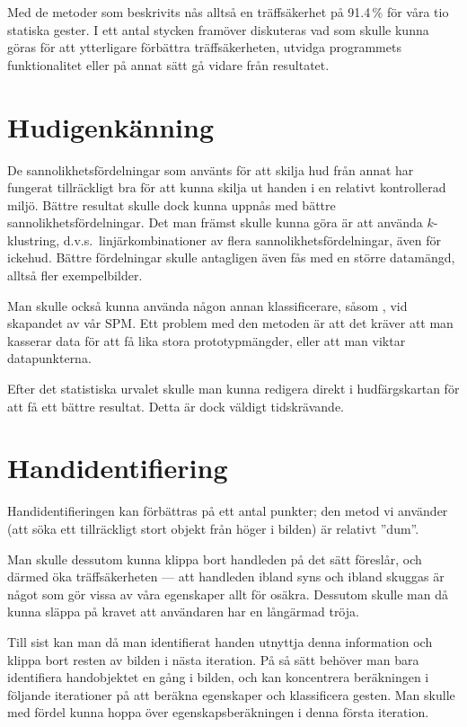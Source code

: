 \documentclass[../rapport_MVEX01-11-05]{subfiles}
\begin{document}
Med de metoder som beskrivits nås alltså en träffsäkerhet på 91.4\,\%
för våra tio statiska gester. I ett antal stycken framöver diskuteras
vad som skulle kunna göras för att ytterligare förbättra
träffsäkerheten, utvidga programmets funktionalitet eller på annat
sätt gå vidare från resultatet.

\section{Hudigenkänning}
De sannolikhetsfördelningar som använts för att skilja hud från annat
har fungerat tillräckligt bra för att kunna skilja ut handen i en
relativt kontrollerad miljö. Bättre resultat skulle dock kunna uppnås
med bättre sannolikhetsfördelningar. Det man främst skulle kunna göra
är att använda $k$-klustring, d.v.s.~linjärkombinationer av flera
sannolikhetsfördelningar, även för ickehud. Bättre fördelningar skulle
antagligen även fås med en större datamängd, alltså fler
exempelbilder.

Man skulle också kunna använda någon annan klassificerare, såsom \knn,
vid skapandet av vår SPM. Ett problem med den metoden är att det
kräver att man kasserar data för att få lika stora prototypmängder,
eller att man viktar datapunkterna.

Efter det statistiska urvalet skulle man kunna redigera direkt i
hudfärgskartan för att få ett bättre resultat. Detta är dock väldigt
tidskrävande.

\section{Handidentifiering}
Handidentifieringen kan förbättras på ett antal punkter;
den metod vi använder (att söka ett tillräckligt stort objekt från höger i
bilden) är relativt ''dum''. 

Man skulle dessutom kunna klippa bort handleden på det sätt
 föreslår, och därmed öka träffsäkerheten --- att
handleden ibland syns och ibland skuggas är något som gör vissa av våra
egenskaper allt för osäkra. Dessutom skulle man då kunna släppa på kravet
att användaren har en långärmad tröja.

Till sist kan man då man identifierat handen utnyttja denna information och
klippa bort resten av bilden i nästa iteration. På så sätt behöver man bara
identifiera handobjektet en gång i bilden, och kan koncentrera beräkningen
i följande iterationer på att beräkna egenskaper och klassificera gesten.
Man skulle med fördel kunna hoppa över egenskapsberäkningen i denna första
iteration.
\end{document}
